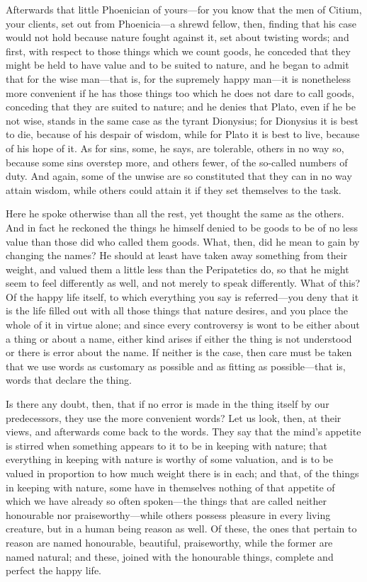  Afterwards that little Phoenician of yours—for you know that the men of Citium, your clients, set out from Phoenicia—a shrewd fellow, then, finding that his case would not hold because nature fought against it, set about twisting words; and first, with respect to those things which we count goods, he conceded that they might be held to have value and to be suited to nature, and he began to admit that for the wise man—that is, for the supremely happy man—it is nonetheless more convenient if he has those things too which he does not dare to call goods, conceding that they are suited to nature; and he denies that Plato, even if he be not wise, stands in the same case as the tyrant Dionysius; for Dionysius it is best to die, because of his despair of wisdom, while for Plato it is best to live, because of his hope of it. As for sins, some, he says, are tolerable, others in no way so, because some sins overstep more, and others fewer, of the so-called numbers of duty. And again, some of the unwise are so constituted that they can in no way attain wisdom, while others could attain it if they set themselves to the task.

 Here he spoke otherwise than all the rest, yet thought the same as the others. And in fact he reckoned the things he himself denied to be goods to be of no less value than those did who called them goods. What, then, did he mean to gain by changing the names? He should at least have taken away something from their weight, and valued them a little less than the Peripatetics do, so that he might seem to feel differently as well, and not merely to speak differently. What of this? Of the happy life itself, to which everything you say is referred—you deny that it is the life filled out with all those things that nature desires, and you place the whole of it in virtue alone; and since every controversy is wont to be either about a thing or about a name, either kind arises if either the thing is not understood or there is error about the name. If neither is the case, then care must be taken that we use words as customary as possible and as fitting as possible—that is, words that declare the thing.

 Is there any doubt, then, that if no error is made in the thing itself by our predecessors, they use the more convenient words? Let us look, then, at their views, and afterwards come back to the words. They say that the mind's appetite is stirred when something appears to it to be in keeping with nature; that everything in keeping with nature is worthy of some valuation, and is to be valued in proportion to how much weight there is in each; and that, of the things in keeping with nature, some have in themselves nothing of that appetite of which we have already so often spoken—the things that are called neither honourable nor praiseworthy—while others possess pleasure in every living creature, but in a human being reason as well. Of these, the ones that pertain to reason are named honourable, beautiful, praiseworthy, while the former are named natural; and these, joined with the honourable things, complete and perfect the happy life.

